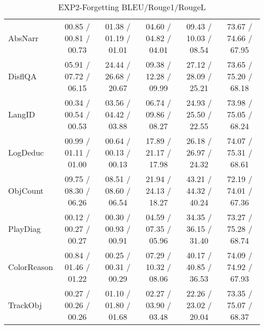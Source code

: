 \begin{table*}[tb]
{\begin{tabular}{lccccc}
    AbsNarr
& 00.85 / 00.81 / 00.73
& 01.38 / 01.19 / 01.01& 04.60 / 04.82 / 04.01& 09.43 / 10.03 / 08.54& 73.67 / 74.66 / 67.95
\\
    DisflQA
& 05.91 / 07.72 / 06.15
& 24.44 / 26.68 / 20.67& 09.38 / 12.28 / 09.99& 27.12 / 28.09 / 25.21& 73.65 / 75.20 / 68.18
\\
    LangID
& 00.34 / 00.54 / 00.53
& 03.56 / 04.42 / 03.88& 06.74 / 09.86 / 08.27& 24.93 / 25.50 / 22.55& 73.98 / 75.05 / 68.24
\\
    LogDeduc
& 00.99 / 01.11 / 01.00
& 00.64 / 00.13 / 00.13& 17.89 / 21.17 / 17.98& 26.18 / 26.97 / 24.32& 74.07 / 75.31 / 68.61
\\
    ObjCount
& 09.75 / 08.30 / 06.26
& 08.51 / 08.60 / 06.54& 21.94 / 24.13 / 18.27& 43.21 / 44.32 / 40.24& 72.19 / 74.01 / 67.36
\\
    PlayDiag
& 00.12 / 00.27 / 00.27
& 00.30 / 00.93 / 00.91& 04.59 / 07.35 / 05.96& 34.35 / 36.15 / 31.40& 73.27 / 75.28 / 68.74
\\
    ColorReason
& 00.84 / 01.46 / 01.22
& 00.25 / 00.31 / 00.29& 07.29 / 10.32 / 08.06& 40.17 / 40.85 / 36.53& 74.09 / 74.92 / 67.93
\\
    TrackObj& 00.27 / 00.26 / 00.26& 01.10 / 01.80 / 01.68& 02.27 / 03.90 / 03.48& 22.26 / 23.02 / 20.04& 73.35 / 75.07 / 68.37\\
    \bottomrule
    \end{tabular}}
   \caption{EXP2-Forgetting BLEU/Rouge1/RougeL}
    \label{tab:EXP2-Forgetting}
\end{table*}



